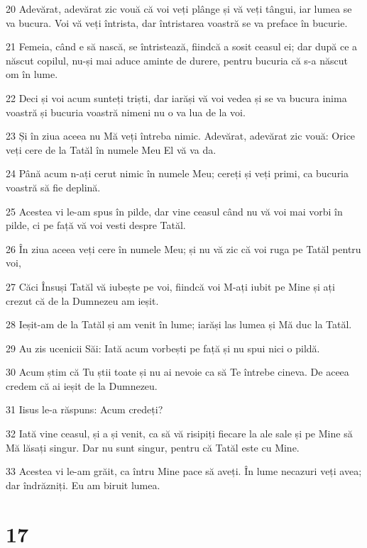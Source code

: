 \par 20 Adevărat, adevărat zic vouă că voi veți plânge și vă veți tângui, iar lumea se va bucura. Voi vă veți întrista, dar întristarea voastră se va preface în bucurie.
\par 21 Femeia, când e să nască, se întristează, fiindcă a sosit ceasul ei; dar după ce a născut copilul, nu-și mai aduce aminte de durere, pentru bucuria că s-a născut om în lume.
\par 22 Deci și voi acum sunteți triști, dar iarăși vă voi vedea și se va bucura inima voastră și bucuria voastră nimeni nu o va lua de la voi.
\par 23 Și în ziua aceea nu Mă veți întreba nimic. Adevărat, adevărat zic vouă: Orice veți cere de la Tatăl în numele Meu El vă va da.
\par 24 Până acum n-ați cerut nimic în numele Meu; cereți și veți primi, ca bucuria voastră să fie deplină.
\par 25 Acestea vi le-am spus în pilde, dar vine ceasul când nu vă voi mai vorbi în pilde, ci pe față vă voi vesti despre Tatăl.
\par 26 În ziua aceea veți cere în numele Meu; și nu vă zic că voi ruga pe Tatăl pentru voi,
\par 27 Căci Însuși Tatăl vă iubește pe voi, fiindcă voi M-ați iubit pe Mine și ați crezut că de la Dumnezeu am ieșit.
\par 28 Ieșit-am de la Tatăl și am venit în lume; iarăși las lumea și Mă duc la Tatăl.
\par 29 Au zis ucenicii Săi: Iată acum vorbești pe față și nu spui nici o pildă.
\par 30 Acum știm că Tu știi toate și nu ai nevoie ca să Te întrebe cineva. De aceea credem că ai ieșit de la Dumnezeu.
\par 31 Iisus le-a răspuns: Acum credeți?
\par 32 Iată vine ceasul, și a și venit, ca să vă risipiți fiecare la ale sale și pe Mine să Mă lăsați singur. Dar nu sunt singur, pentru că Tatăl este cu Mine.
\par 33 Acestea vi le-am grăit, ca întru Mine pace să aveți. În lume necazuri veți avea; dar îndrăzniți. Eu am biruit lumea.

\chapter{17}

